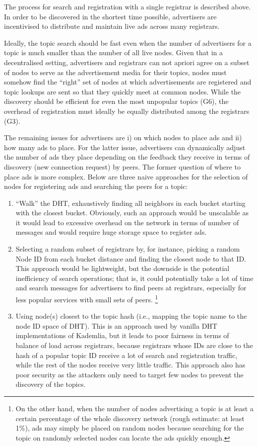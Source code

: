 The process for search and registration with a single registrar is described above. In order to be discovered in the shortest time possible, advertisers are incentivised to distribute and maintain live ads across many registrars. 

Ideally, the topic search should be fast even when the number of advertisers for a topic is much smaller than the number of all live nodes. Given that in a decentralised setting, advertisers and registrars can not apriori agree on a subset of nodes to serve as the advertisement media for their topics, nodes must somehow find the ``right'' set of nodes at which advertisements are registered and topic lookups are sent so that they quickly meet at common nodes. While the discovery should be efficient for even the most unpopular topics (G6), the overhead of registration must ideally be equally distributed among the registrars (G3). 

The remaining issues for advertisers are i) on which nodes to place ads and ii) how many ads to place. For the latter issue, advertisers can dynamically adjust the number of ads they place depending on the feedback they receive in terms of discovery (\ie new connection request) by peers. The former question of where to place ads is more complex. Below are three naive approaches for the selection of nodes for registering ads and searching the peers for a topic:
\begin{enumerate} 
\item ``Walk'' the DHT, exhaustively finding all neighbors in each bucket starting with the closest bucket. Obviously, such an approach would be unscalable as it would lead to excessive overhead on the network in terms of number of messages and would require huge storage space to register ads.
\item Selecting a random subset of registrars by, for instance, picking a random Node ID from each bucket distance and finding the closest node to that ID.
This approach would be lightweight, but the downside is the potential inefficiency of search operations; that is, it could potentially take a lot of time and search messages for advertisers to find peers at registrars, especially for less popular services with small sets of peers.
\footnote{On the other hand, when the number of nodes advertising a topic is at least a certain percentage of the whole discovery network (rough estimate: at least 1\%), ads may simply be placed on random nodes because searching for the topic on randomly selected nodes can locate the ads quickly enough.}
\item Using node(s) closest to the topic hash (i.e., mapping the topic name to the node ID space of DHT). This is an approach used by vanilla DHT implementations of Kademlia, but it leads to poor fairness in terms of balance of load across registrars, because registrars whose IDs are close to the hash of a popular topic ID receive a lot of search and registration traffic, while the rest of the nodes receive very little traffic. This approach also has poor security as the attackers only need to target few nodes to prevent the discovery of the topics.
\end{enumerate}

